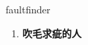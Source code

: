 
\begin{frame}
{\huge faultfinder}
\begin{center}
\begin{enumerate}\Large
  \item \textbf{吹毛求疵的人}
\end{enumerate}
\end{center}
\end{frame}

